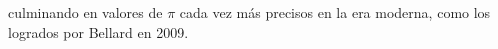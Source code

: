 \documentclass[preview]{standalone}
\begin{document}
\begin{center}
culminando en valores de $\pi$ cada vez más precisos en la era moderna, como los logrados por Bellard en 2009.
\end{center}
\end{document}
